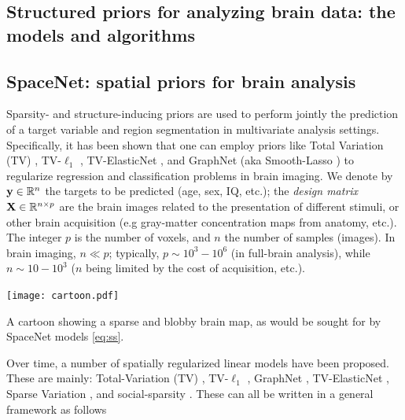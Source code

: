 \begin{fullwidth}
\chapter{Structured priors for analyzing brain data: the models and algorithms}\label{chap:hrf_estimation}
\end{fullwidth}

\section{SpaceNet: spatial priors for brain analysis}
Sparsity- and structure-inducing priors are used to
perform jointly the prediction of a target variable and region
segmentation in multivariate analysis settings.
%
Specifically, it has been shown that one can employ priors like Total
Variation (TV)  \cite{michel2011tv}, TV-$\ell_1$
 \cite{baldassarre2012,gramfort2013}, TV-ElasticNet
 \cite{dubois2014predictive},
and GraphNet  \cite{grosenick2013}
(aka Smooth-Lasso  \cite{hebiri2011})
to regularize regression and classification
problems in brain imaging.
%
We denote by ${\mathbf{y}} \in \mathbb{R}^{n}$ the targets to
be predicted (age, sex, IQ, etc.); the \textit{design matrix}
${\mathbf{X}}\in\mathbb{R}^{n \times p}$ are the
brain images related to the presentation of different
stimuli, or other brain acquisition (e.g gray-matter concentration
maps from anatomy, etc.). The integer $p$ is the number of voxels,
and $n$ the number of samples (images). In brain imaging, $n \ll p$;
typically, $p \sim 10^3-10^6$ (in full-brain analysis),
while $n \sim 10-10^3$ ($n$ being limited by the cost of acquisition,
etc.).

\begin{marginfigure}[4cm]
  \centering
  \texttt{[image: cartoon.pdf]}
  \caption{A cartoon showing a sparse and blobby brain map,
  as would be sought for by SpaceNet models \eqref{eq:ss}.}
  \label{fig:roi}
\end{marginfigure}



Over time, a number of spatially regularized linear models have been proposed. These are mainly: Total-Variation (TV)
   \citep{michel2011tv}, TV-$\ell_1$  \citep{baldassarre2012,gramfort2013}, GraphNet  \citep{grosenick2013,hebiri2011},
  TV-ElasticNet  \citep{dubois2014predictive}, Sparse Variation  \citep{eickenberg2015total}, and social-sparsity  \citep{kowalski2013social}. These can all be written in a general framework as follows

